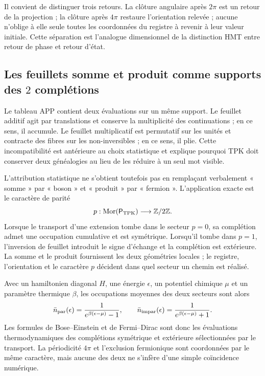 Il convient de distinguer trois retours. La clôture angulaire après \(2\pi\) est un
retour de la projection ; la clôture après \(4\pi\) restaure l’orientation
relevée ; aucune n’oblige à elle seule toutes les coordonnées du registre à
revenir à leur valeur initiale. Cette séparation est l’analogue dimensionnel de la
distinction HMT entre retour de phase et retour d’état.

\subsection{Les feuillets somme et produit comme supports des \(2\) complétions}

Le tableau APP contient deux évaluations sur un même support. Le feuillet
additif agit par translations et conserve la multiplicité des
continuations ; en ce sens, il accumule. Le feuillet multiplicatif est
permutatif sur les unités et contracte des fibres sur les non-inversibles ; en
ce sens, il plie. Cette incompatibilité est antérieure au choix
statistique et explique pourquoi TPK doit conserver deux généalogies au lieu de
les réduire à un seul mot visible.

L’attribution statistique ne s’obtient toutefois pas en remplaçant
verbalement « somme » par « boson » et « produit » par « fermion ». L’application exacte est
le caractère de parité
\[
 p:\operatorname{Mor}(\mathsf P_{\rm TPK})\longrightarrow\mathbb Z/2\mathbb Z.
\]
Lorsque le transport d’une extension tombe dans le secteur \(p=0\), sa
complétion admet une occupation cumulative et est symétrique. Lorsqu’il tombe dans
\(p=1\), l’inversion de feuillet introduit le signe d’échange et la
complétion est extérieure. La somme et le produit fournissent les deux
géométries locales ; le registre, l’orientation et le caractère \(p\) décident dans
quel secteur un chemin est réalisé.

Avec un hamiltonien diagonal \(H\), une énergie \(\epsilon\), un potentiel chimique
\(\mu\) et un paramètre thermique \(\beta\), les occupations moyennes des deux
secteurs sont alors
\[
 \bar n_{\rm par}(\epsilon)
 =\frac{1}{e^{\beta(\epsilon-\mu)}-1},
 \qquad
 \bar n_{\rm impar}(\epsilon)
 =\frac{1}{e^{\beta(\epsilon-\mu)}+1}.
\]
Les formules de Bose--Einstein et de Fermi--Dirac sont donc les
évaluations thermodynamiques des complétions symétrique et extérieure
sélectionnées par le transport. La périodicité \(4\pi\) et l'exclusion
fermionique sont coordonnées par le même caractère, mais aucune des deux
ne s'infère d'une simple coïncidence numérique.

